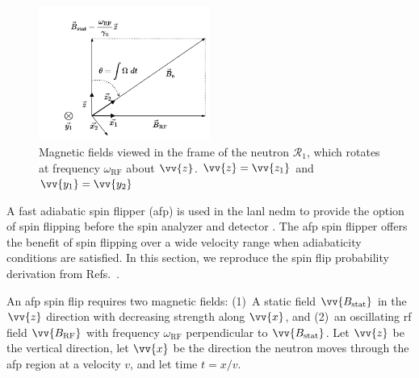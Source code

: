 \begin{figure}[htp]
    \centering
    \includegraphics[width=0.5\textwidth]{figures/adiabatic_spin_flip.pdf}
    \caption[{Magnetic fields viewed in the frame of the neutron $\mathcal{R}_1$, which rotates at frequency $\omega_\text{RF}$ about $\vec{z}$}]
            {Magnetic fields viewed in the frame of the neutron $\mathcal{R}_1$, which rotates at frequency $\omega_\text{RF}$ about $\vv{z}$. $\vv{z}=\vv{z_1}$ and $\vv{y_1}=\vv{y_2}$}
    \label{fig:adiabatic_spin_flip}
\end{figure}

A fast adiabatic spin flipper (\acrshort{afp}) is used in the \acrshort*{lanl} \acrshort*{nedm} to provide the option of spin flipping \ucn before the spin analyzer and detector \cite{holley_afp_2012}. The \acrshort*{afp} spin flipper offers the benefit of spin flipping \ucn over a wide velocity range when adiabaticity conditions are satisfied. In this section, we reproduce the spin flip probability derivation from Refs.~\cite{robiscoe_spin_flip, grigoriev_neutron_2001, rogel_thesis}.

An \acrshort*{afp} spin flip requires two magnetic fields: (1)~A static field $\vv{B_\text{stat}}$ in the $\vv{z}$ direction with decreasing strength along $\vv{x}$, and (2)~an oscillating \acrshort{rf} field $\vv{B_\text{RF}}$ with frequency $\omega_\text{RF}$ perpendicular to $\vv{B_\text{stat}}$. Let $\vv{z}$ be the vertical direction, let $\vv{x}$ be the direction the neutron moves through the \acrshort*{afp} region at a velocity $v$, and let time $t=x/v$.

